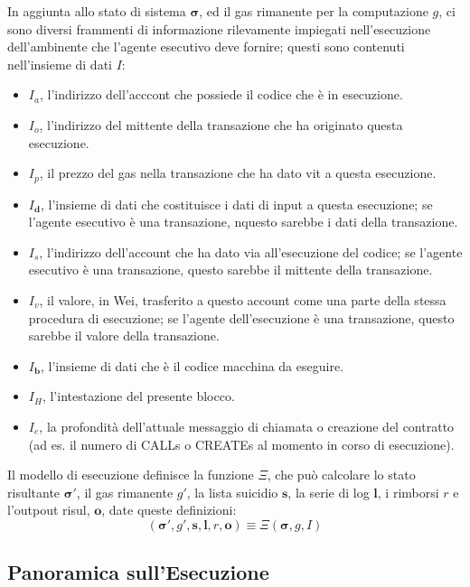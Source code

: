 \documentclass[9pt,oneside]{amsart}
\begin{document}
\begin{multicols}{2}
In aggiunta allo stato di sistema $\boldsymbol{\sigma}$, ed il gas rimanente per la computazione $g$, ci sono diversi frammenti di informazione rilevamente impiegati nell'esecuzione dell'ambinente che l'agente esecutivo deve fornire; questi sono contenuti nell'insieme di dati $I$:

\begin{itemize}
\item $I_a$, l'indirizzo dell'acccont che possiede il codice che è in esecuzione.
\item $I_o$, l'indirizzo del mittente della transazione che ha originato questa esecuzione.
\item $I_p$, il prezzo del gas nella transazione che ha dato vit a questa esecuzione.
\item $I_\mathbf{d}$, l'insieme di dati che costituisce i dati di input a questa esecuzione; se l'agente esecutivo è una transazione, nquesto sarebbe i dati della transazione.
\item $I_s$, l'indirizzo dell'account che ha dato via all'esecuzione del codice; se l'agente esecutivo è una transazione, questo sarebbe il mittente della transazione.
\item $I_v$, il valore, in Wei, trasferito a questo account come una parte della stessa procedura di esecuzione; se l'agente dell'esecuzione è una transazione, questo sarebbe il valore della transazione.
\item $I_\mathbf{b}$, l'insieme di dati che è il codice macchina da eseguire.
\item $I_H$, l'intestazione del presente blocco.
\item $I_e$, la profondità dell'attuale messaggio di chiamata o creazione del contratto (ad es. il numero di {\small CALL}s o {\small CREATE}s al momento in corso di esecuzione).
\end{itemize}

Il modello di esecuzione definisce la funzione $\Xi$, che può calcolare lo stato risultante $\boldsymbol{\sigma}'$, il gas rimanente $g'$, la lista suicidio $\mathbf{s}$, la serie di log $\mathbf{l}$, i rimborsi $r$ e l'outpout risul, $\mathbf{o}$, date queste definizioni:
\begin{equation}
(\boldsymbol{\sigma}', g', \mathbf{s}, \mathbf{l}, r, \mathbf{o}) \equiv \Xi(\boldsymbol{\sigma}, g, I)
\end{equation}

\subsection{Panoramica sull'Esecuzione}


\end{multicols}
\end{document}
